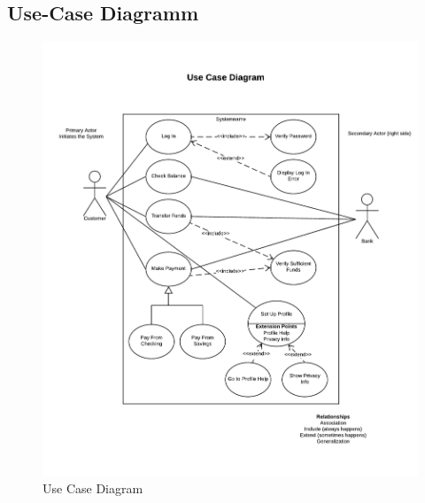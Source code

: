 \documentclass[11pt, a4paper]{article}
\begin{document}
    \subsection{Use-Case Diagramm}
      \begin{figure}[h!]
        \includegraphics[width=\linewidth]{fig/use_case_diagram.pdf}
        \caption{Use Case Diagram}
        \label{fig:usecasediagram}
      \end{figure}
      \newpage
\end{document}
